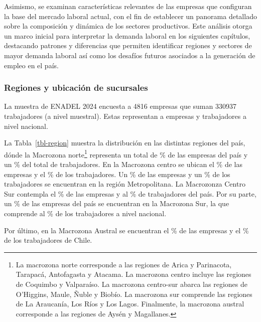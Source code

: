 \documentclass[
  11pt,
]{article}
\begin{document}
Asimismo, se examinan características relevantes de las empresas que
configuran la base del mercado laboral actual, con el fin de establecer
un panorama detallado sobre la composición y dinámica de los sectores
productivos. Este análisis otorga un marco inicial para interpretar la
demanda laboral en los siguientes capítulos, destacando patrones y
diferencias que permiten identificar regiones y sectores de mayor
demanda laboral así como los desafíos futuros asociados a la generación
de empleo en el país.

\FloatBarrier

\subsubsection{Regiones y ubicación de
sucursales}\label{regiones-y-ubicaciuxf3n-de-sucursales}

La muestra de ENADEL 2024 encuesta a 4816 empresas que suman 330937
trabajadores (a nivel muestral). Estas representan a 
empresas y  trabajadores a nivel nacional.

La Tabla~\ref{tbl-region} muestra la distribución en las distintas
regiones del país, dónde la Macrozona norte\footnote{La macrozona norte
  corresponde a las regiones de Arica y Parinacota, Tarapacá,
  Antofagasta y Atacama. La macrozona centro incluye las regiones de
  Coquimbo y Valparaíso. La macrozona centro-sur abarca las regiones de
  O'Higgins, Maule, Ñuble y Biobío. La macrozona sur comprende las
  regiones de La Araucanía, Los Ríos y Los Lagos. Finalmente, la
  macrozona austral corresponde a las regiones de Aysén y Magallanes.}
representa un total de \% de las empresas del país y un
\% del total de trabajadores. En la Macrozona centro se ubican
el \% de las empresas y el \% de los trabajadores.
Un \% de las empresas y un \% de los trabajadores se
encuentran en la región Metropolitana. La Macrozonza Centro Sur
contempla el \% de las empresas y al \% de
trabajadores del país. Por su parte, un \% de las empresas
del país se encuentran en la Macrozona Sur, la que comprende al
\% de los trabajadores a nivel nacional.

Por último, en la Macrozona Austral se encuentran el \% de las
empresas y el \% de los trabajadores de Chile.

\vspace{5mm}

\FloatBarrier
\end{document}
